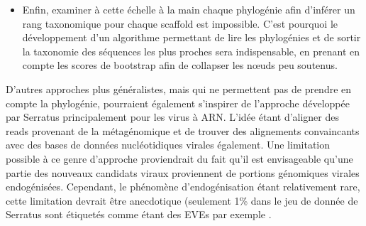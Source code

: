 \begin{itemize}
    \item Enfin, examiner à cette échelle à la main chaque phylogénie afin d'inférer un rang taxonomique pour chaque scaffold est impossible. C'est pourquoi le développement d'un algorithme permettant de lire les phylogénies et de sortir la taxonomie des séquences les plus proches sera indispensable, en prenant en compte les scores de bootstrap afin de collapser les nœuds peu soutenus. 
    
\end{itemize}

D'autres approches plus généralistes, mais qui ne permettent pas de prendre en compte la phylogénie, pourraient également s'inspirer de l'approche développée par Serratus \citep{edgar_petabase-scale_2022} principalement pour les virus à ARN. L'idée étant d'aligner des reads provenant de la métagénomique et de trouver des alignements convaincants avec des bases de données nucléotidiques virales également. Une limitation possible à ce genre d'approche proviendrait du fait qu'il est envisageable qu'une partie des nouveaux candidats viraux proviennent de portions génomiques virales endogénisées. Cependant, le phénomène d'endogénisation étant relativement rare, cette limitation devrait être anecdotique (seulement 1\% dans le jeu de donnée de Serratus sont étiquetés comme étant des EVEs par exemple \citep{edgar_petabase-scale_2022}.\\


%






